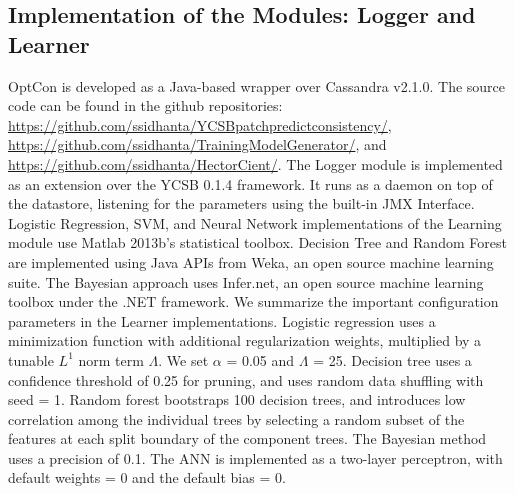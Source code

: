 \documentclass[conference]{IEEEtran}
\begin{document}
\subsection{Implementation of the Modules: Logger and Learner}\label{sec:impl}
OptCon is developed as a Java-based wrapper over Cassandra v2.1.0.  The source code can be found in the github
repositories: \url{https://github.com/ssidhanta/YCSBpatchpredictconsistency/}, \url{https://github.com/ssidhanta/TrainingModelGenerator/}, and \url{https://github.com/ssidhanta/HectorCient/}.
The Logger module is implemented as an extension over the YCSB 0.1.4 \cite{Cooper:2010:BCS:1807128.1807152} framework. It runs as a daemon on top of the datastore, listening for the parameters using the built-in JMX Interface.
Logistic Regression, SVM, and Neural Network implementations of the Learning module use Matlab 2013b's statistical toolbox. Decision Tree and Random Forest are implemented using Java APIs from Weka, an open source machine learning suite.
The Bayesian approach uses Infer.net, an open source machine learning toolbox under the .NET framework.
   We summarize the important configuration parameters in the Learner implementations. Logistic regression uses a minimization function with additional regularization weights, multiplied by a tunable $L^1$ norm term $\Lambda$. We set  $\alpha$ = 0.05 and $\Lambda$ = 25.
  Decision tree uses a confidence threshold  of 0.25 for pruning, and uses random data shuffling with seed = 1. Random forest  bootstraps 100 decision trees, and introduces low correlation  among the individual trees by selecting a random subset of the features at each split boundary of the component trees.  The Bayesian method uses a precision of 0.1. The ANN is implemented as a two-layer perceptron, with default weights = 0 and the  default bias = 0. 
\end{document}
